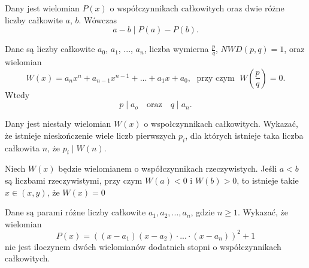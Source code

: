 


\noindent
Dany jest wielomian $P(x)$ o współczynnikach całkowitych oraz dwie różne liczby całkowite $a$, $b$. Wówczas
\[
	a - b \mid P(a) - P(b).
\]





\noindent
Dane są liczby całkowite $a_0$, $a_1$, ..., $a_n$, liczba wymierna $\frac{p}{q}$, $NWD(p, q) = 1$, oraz wielomian 
\[
	W(x) = a_nx^n + a_{n - 1}x^{n - 1} + ... + a_1x + a_0, \; \text{ przy czym } \; W\left(\frac{p}{q}\right) = 0.
\] 
 Wtedy
\[
	p \mid a_o \quad \text{oraz} \quad q \mid a_{n}.
\]



Dany jest niestały wielomian $W(x)$ o wspołczynnikach całkowitych. Wykazać, że istnieje nieskończenie wiele liczb pierwszych $p_i$, dla których istnieje taka liczba całkowita $n$, że $p_i \mid W(n)$.



\noindent
Niech $W(x)$ będzie wielomianem o współczynnikach rzeczywistych. Jeśli $a < b$ są liczbami rzeczywistymi, przy czym $W(a) < 0$ i $W(b) > 0$, to istnieje takie $x \in (x, y)$, że $W(x) = 0$



\noindent
Dane są parami różne liczby całkowite $a_1, a_2, ..., a_n$, gdzie $n \geqslant 1$. Wykazać, że wielomian 
\[
	P(x)=((x − a_1)(x − a_2)\cdot ...\cdot (x − a_n))^2 + 1
\]
nie jest iloczynem dwóch wielomianów dodatnich stopni o współczynnikach całkowitych.

